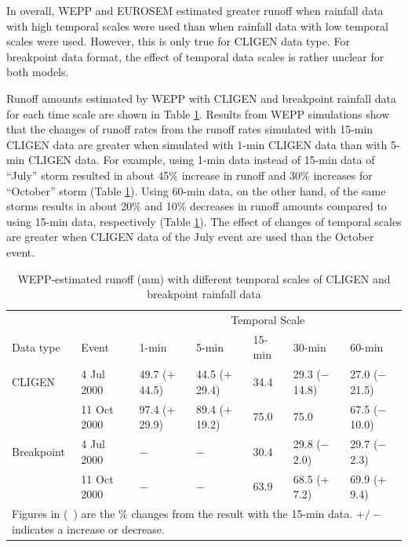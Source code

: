 In overall, WEPP and EUROSEM estimated greater runoff when rainfall data
with high temporal scales were used than when rainfall data with low temporal
scales were used. However, this is only true for CLIGEN data type. For
breakpoint data format, the effect of temporal data scales is rather unclear for
both models.

Runoff amounts estimated by WEPP with CLIGEN and breakpoint rainfall data for
each time scale are shown in Table
\ref{tab:DifferentTemporalScalesOfRainfallDataOnWEPPRunoffEstimation}. Results
from WEPP simulations show that the changes of runoff rates from the runoff
rates simulated with 15-min CLIGEN data are greater when simulated with 1-min
CLIGEN data than with 5-min CLIGEN data. For example, using 1-min data instead
of 15-min data of ``July'' storm resulted in about 45\% increase in runoff and
30\% increases for ``October'' storm (Table
\ref{tab:DifferentTemporalScalesOfRainfallDataOnWEPPRunoffEstimation}). Using
60-min data, on the other hand, of the same storms results in about 20\% and
10\% decreases in runoff amounts compared to using 15-min data, respectively
(Table \ref{tab:DifferentTemporalScalesOfRainfallDataOnWEPPRunoffEstimation}).
The effect of changes of temporal scales are greater when CLIGEN data of the
July event are used than the October event.

\begin{table}[htbp]
  \centering
  \footnotesize
  \caption[WEPP-estimated runoff with different temporal scales of CLIGEN and
breakpoint rainfall data]{WEPP-estimated runoff (mm) with different temporal
scales of CLIGEN and breakpoint rainfall data}
  \label{tab:DifferentTemporalScalesOfRainfallDataOnWEPPRunoffEstimation}
    \begin{tabular}{lllllll}
      \toprule
      & & \multicolumn{5}{c}{Temporal Scale}\\
      \cmidrule{3-7}
      Data type & Event & 1-min & 5-min & 15-min & 30-min & 60-min \\
      \midrule
      CLIGEN & 4 Jul 2000 & 49.7 ($+$44.5) & 44.5 ($+$29.4) & 34.4 & 29.3
($-$14.8) & 27.0 ($-$21.5) \\
       & 11 Oct 2000 & 97.4 ($+$29.9) & 89.4 ($+$19.2) & 75.0 & 75.0 & 67.5
($-$10.0) \\
       \midrule
      Breakpoint & 4 Jul 2000 & $-$ & $-$ & 30.4 & 29.8 ($-$2.0) & 29.7
($-$2.3)\\
       & 11 Oct 2000 & $-$ & $-$ & 63.9 & 68.5 ($+$7.2) & 69.9 ($+$9.4)\\
      \bottomrule
      \multicolumn{7}{p{12cm}}{\footnotesize Figures in (\ ) are the \% changes
from the result with the 15-min data. $+/-$ indicates a increase or decrease.}\\
    \end{tabular}
\end{table}

